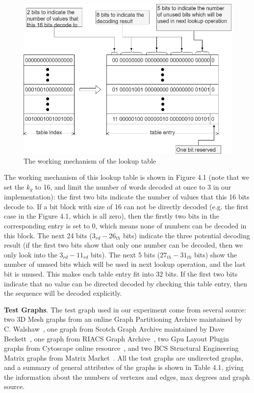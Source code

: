 \documentclass[12pt,glossary]{dalthesis}
\begin{document}
\begin{figure}[ht]
\centering
\includegraphics[width=1.0\textwidth]{Decoding}
\caption{The working mechanism of the lookup table}
\end{figure}

\bigskip

The working mechanism of this lookup table is shown in Figure 4.1 (note that we set the $k_{g}$ to 16, and limit the number of words decoded at once to 3 in our implementation): the first two bits indicate the number of values that this 16 bits decode to. If a bit block with size of 16 can not be directly decoded (e.g. the first case in the Figure 4.1, which is all zero), then the firstly two bits in the corresponding entry is set to 0, which means none of numbers can be decoded in this block. The next 24 bits ($3_{rd} - 26_{th}$ bits) indicate the three potential decoding result (if the first two bits show that only one number can be decoded, then we only look into the $3_{rd} - 11_{rd}$ bits). The next 5 bits ($27_{th} - 31_{th}$ bits) show the number of unused bits which will be used in next lookup operation, and the last bit is unused. This makes each table entry fit into 32 bits. If the first two bits indicate that no value can be directed decoded by checking this table entry, then the sequence will be decoded explicitly.

\textbf{Test Graphs}. The test graph used in our experiment come from several source: two 3D Mesh graphs from an online Graph Partitioning Archive maintained by C. Walshaw~\cite{3DMESH}, one graph from Scotch Graph Archive maintained by Dave Beckett~\cite{Scotch}, one graph from RIACS Graph Archive~\cite{RIACS}, two Gpu Layout Plugin graphs from Cytoscape online resource~\cite{Cytoscape}, and two BCS Structural Engineering Matrix graphs from Matrix Market~\cite{Matrix}. All the test graphs are undirected graphs, and a summary of general attributes of the graphs is shown in Table 4.1, giving the information about the numbers of vertexes and edges, max degrees and graph source.
\end{document}
